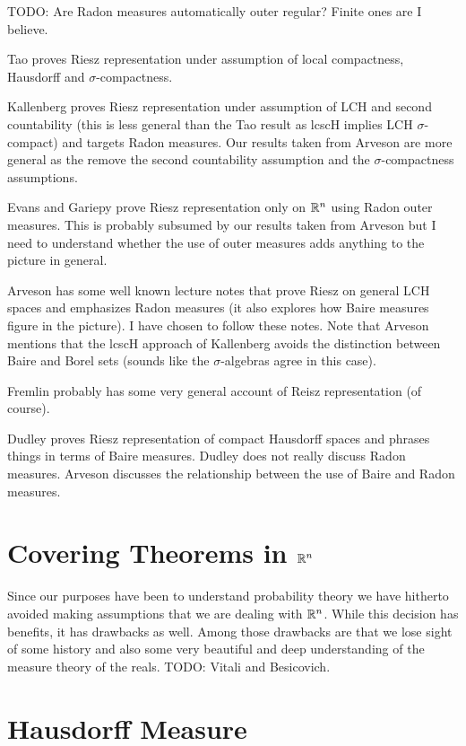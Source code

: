 TODO: Are Radon measures automatically outer regular?  Finite ones are
I believe.

Tao proves Riesz representation under assumption of local compactness, Hausdorff
and $\sigma$-compactness.

Kallenberg proves Riesz representation under assumption of LCH and
second countability (this is less general than the Tao
result as lcscH implies LCH $\sigma$-compact)
and targets Radon measures.  Our results taken from Arveson are more
general as the remove the second countability assumption and the $\sigma$-compactness
assumptions.

Evans and Gariepy prove Riesz representation only on $\mathbb{R}^n$ using
Radon outer measures.  This is probably subsumed by our results taken
from Arveson but I need to understand whether the use of outer
measures adds anything to the picture in general.

Arveson has some well known lecture notes that prove Riesz on general
LCH spaces
and emphasizes Radon measures (it also explores how Baire measures figure in the
picture).  I have chosen to follow these notes.  Note that Arveson
mentions that the lcscH approach of Kallenberg avoids the distinction
between Baire and Borel sets (sounds like the $\sigma$-algebras agree
in this case).

Fremlin probably has some very general account of Reisz representation
(of course).

Dudley proves Riesz representation of compact Hausdorff spaces and
phrases things in terms of Baire measures.  Dudley does not really
discuss Radon measures.  Arveson discusses the relationship between
the use of Baire and Radon measures.

\section{Covering Theorems in $\mathbb{R}^n$}

Since our purposes have been to understand probability theory we have
hitherto avoided making assumptions that we are dealing with
$\mathbb{R}^n$.  While this decision has benefits, it has drawbacks as
well.  Among those drawbacks are that we lose sight of some history and also some very
beautiful and deep understanding of the measure theory of the reals.
TODO: Vitali and Besicovich.

\section{Hausdorff Measure}

